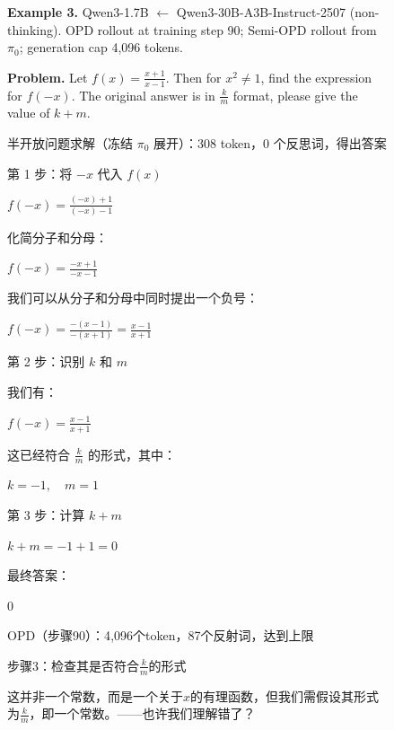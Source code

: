 \begin{figure}[p]
\centering
\begin{qualproblem}
\textbf{Example 3.} Qwen3-1.7B $\leftarrow$ Qwen3-30B-A3B-Instruct-2507 (non-thinking). OPD rollout at training step 90; Semi-OPD rollout from $\pi_0$; generation cap 4{,}096 tokens.\par\smallskip
\textbf{Problem.} Let $f(x) = \frac{x+1}{x-1}$. Then for $x^2 \neq 1$, find the expression for $f(-x)$. The original answer is in $\frac{k}{m}$ format, please give the value of $k + m$.
\end{qualproblem}
\vspace{-1pt}
\begin{minipage}[t]{0.495\linewidth}\vspace{0pt}
\begin{Semi-OPDbox}{半开放问题求解（冻结 $\pi_0$ 展开）：308 token，0 个反思词，得出答案}

第 1 步：将 $-x$ 代入 $f(x)$

$f(-x) = \frac{(-x) + 1}{(-x) - 1}$

化简分子和分母：

$f(-x) = \frac{-x + 1}{-x - 1}$

我们可以从分子和分母中同时提出一个负号：

$f(-x) = \frac{-(x - 1)}{-(x + 1)} = \frac{x - 1}{x + 1}$

第 2 步：识别 $k$ 和 $m$

我们有：

$f(-x) = \frac{x - 1}{x + 1}$

这已经符合 $\frac{k}{m}$ 的形式，其中：

$k = -1,\allowbreak \quad m = 1$

第 3 步：计算 $k + m$

$k + m = -1 + 1 = \boxed{0}$

最终答案：

$\boxed{0}$
\end{Semi-OPDbox}
\end{minipage}\hfill
\begin{minipage}[t]{0.495\linewidth}\vspace{0pt}
\begin{opdbox}{OPD（步骤90）：4{,}096个token，87个反射词，达到上限}

步骤3：检查其是否符合$\frac{k}{m}$的形式

这并非一个常数，而是一个关于$x$的有理函数，但我们需假设其形式为$\frac{k}{m}$，即一个常数。——也许我们理解错了？


\end{opdbox}
\end{minipage}
\end{figure}
